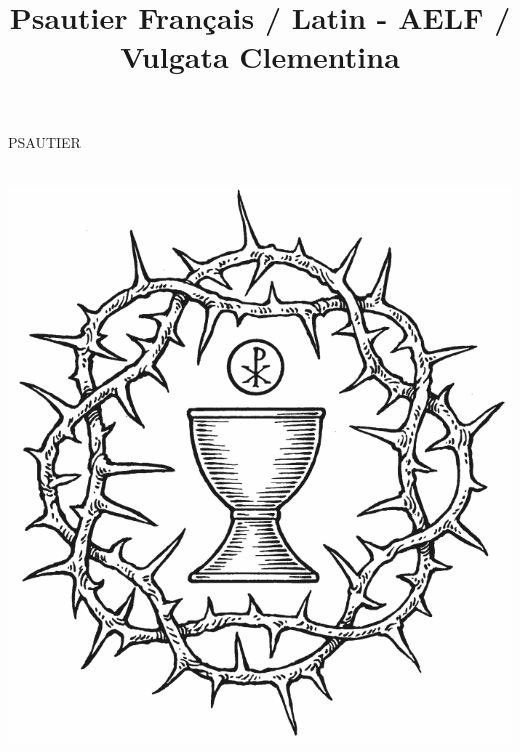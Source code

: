 \documentclass[paper=a5,pagesize=pdftex,fontsize=15pt,headinclude=on,twoside=off]{scrbook}
\title{Psautier Français / Latin - AELF / Vulgata Clementina}
\begin{document}
\pagestyle{empty}
\hspace{0pt}
\vfill
\begin{center}
  \begin{minipage}{0.7\textwidth}
    \begin{center}
      {\headerfont\Huge PSAUTIER} \\
    \end{center}
  \end{minipage}
  \\
  \vspace{0.1\pageheight}
  \includegraphics[height=0.4\pageheight]{ofielcatolico/Eucaristia-Coroa.png}
\end{center}
\vfill
\hspace{0pt}
\newpage
\end{document}
